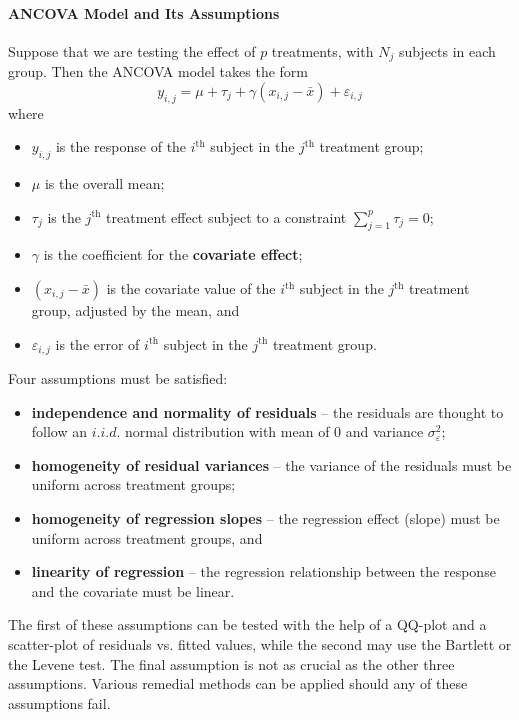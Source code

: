 \paragraph{ANCOVA Model and Its Assumptions}
Suppose that we are testing the effect of $p$ treatments, with $N_{j}$ subjects in each group. Then the ANCOVA model takes the form
\begin{equation}\label{eq:ANCOVA}
    y_{i,j}=\mu+\tau_{j}+\gamma (x_{i,j}-\bar{x})+\varepsilon_{i,j}
\end{equation}
where 
\begin{itemize}[noitemsep]
    \item $y_{i,j}$ is the response of the $i^{\text{th}}$ subject in the $j^{\text{th}}$ treatment group;
    \item $\mu$ is the overall mean;
    \item $\tau_{j}$ is the $j^{\text{th}}$ treatment effect subject to a constraint $\sum_{j=1}^{p}\tau_{j}=0$;
    \item $\gamma$ is the coefficient for the \textbf{covariate effect};
    \item $(x_{i,j}-\bar{x})$ is the covariate value of the $i^{\text{th}}$ subject in the $j^{\text{th}}$ treatment group, adjusted by the mean, and
    \item $\varepsilon_{i,j}$ is the error of $i^{\text{th}}$ subject in the $j^{\text{th}}$ treatment group.
\end{itemize}
Four assumptions must be satisfied:
\begin{itemize}[noitemsep]
    \item \textbf{independence and normality of residuals} -- the residuals are thought to follow an ${i.i.d.}$ normal distribution with mean of $0$ and variance $\sigma^{2}_{\varepsilon}$;
    \item \textbf{homogeneity of residual variances} -- the variance of the residuals must be uniform across treatment groups;
    \item \textbf{homogeneity of regression slopes} -- the regression effect (slope) must be uniform across treatment groups, and
    \item \textbf{linearity of regression} -- the regression relationship between the response and the covariate must be linear.
\end{itemize}
The first of these assumptions can be tested with the help of a QQ-plot and a scatter-plot of residuals vs. fitted values, while the second may use the Bartlett or the Levene test. The final assumption is not as crucial as the other three assumptions. Various remedial methods can be applied should any of these assumptions fail.  
